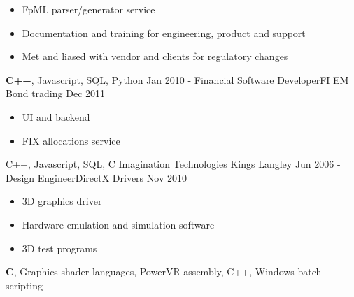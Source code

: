 \begin{experiences}
{\begin{itemize}
\begin{itemize}
                \item FpML parser/generator service
                \item Documentation and training for engineering, product and support
                \item Met and liased with vendor and clients for regulatory changes
                \end{itemize}
                \end{itemize}
               }
               {\textbf{C++}, Javascript, SQL, Python}
    \experience
    {Jan 2010 -}   {Financial Software Developer}{FI EM Bond trading}
    {Dec 2011} {
                \begin{itemize}
                \item UI and backend
                \item FIX allocations service
                \end{itemize}
               }
               {C++, Javascript, SQL, C}                    
  \emptySeparator
  \topofexperience
  	{Imagination Technologies} {Kings Langley}
  \experience
    {Jun 2006 -} {Design Engineer}{DirectX Drivers}
    {Nov 2010} {
                \begin{itemize}
                \item 3D graphics driver
                \item Hardware emulation and simulation software
                \item 3D test programs
                \end{itemize}
                }
                {\textbf{C}, Graphics shader languages, PowerVR assembly, C++, Windows batch scripting}
  \emptySeparator

\end{experiences}
